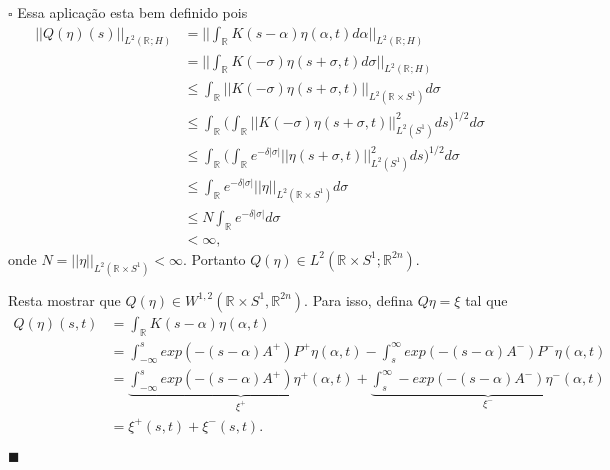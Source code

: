 \documentclass[12pt]{book}
\newenvironment{prova}[1]{$\square$ #1}{\hfill$\blacksquare$}
\newcommand{\circulo}{S^{1}}
\newcommand{\espacoLdois}[1]{L^{2}(#1)}
\newcommand{\espacoLpGeral}[2]{L^{#1}(#2)}
\newcommand{\espacosobolevdois}[2]{\espacosobolevgeral{2}{#1, #2}}
\newcommand{\espacosobolevgeral}[2]{W^{1,#1}(#2)}
\newcommand{\norma}[1]{||#1||}
\newcommand{\normagrande}[1]{\Big|\Big|#1\Big|\Big|}
\newcommand{\retacartesianocirculo}{\real{} \times \circulo}
\newcommand{\real}[1]{\mathbb{R}^{#1}}
\newcommand{\reta}{\real{}}
\begin{document}
\begin{prova}
		Essa aplicação esta bem definido pois
		$$
		\begin{aligned}
		\norma{Q(\eta)(s)}_{\espacoLpGeral{2}{\reta;H}} &= \normagrande{\int_{\real{}}K(s-\alpha)\eta(\alpha, t)d\alpha}_{\espacoLpGeral{2}{\reta;H}}
		\\
		&= \normagrande{\int_{\real{}}K(-\sigma)\eta(s+\sigma, t)d\sigma}_{\espacoLpGeral{2}{\reta;H}}
		\\
		&\leq
		\int_{\reta}\norma{K(-\sigma)\eta(s+\sigma, t)}_{\espacoLpGeral{2}{\retacartesianocirculo}}d\sigma
		\\
		&\leq
		\int_{\reta}\Big(\int_{\reta} \norma{K(-\sigma)\eta(s+\sigma, t)}_{\espacoLdois{\circulo}}^{2}ds\Big)^{1/2}d\sigma
		\\
		&\leq
		\int_{\reta}\Big(\int_{\reta}e^{-\delta|\sigma|} \norma{\eta(s+\sigma, t)}_{\espacoLdois{\circulo}}^{2}ds\Big)^{1/2}d\sigma
		\\
		&\leq
		\int_{\reta}e^{-\delta|\sigma|}\norma{\eta}_{\espacoLdois{\retacartesianocirculo}}d\sigma
		\\
		&\leq N\int_{\reta}e^{-\delta|\sigma|}d\sigma
		\\
		&< \infty,	
		\end{aligned}
		$$
		onde $N=\norma{\eta}_{\espacoLdois{\retacartesianocirculo}}
		<\infty$. Portanto $Q(\eta) \in \espacoLdois{\retacartesianocirculo;\real{2n}}$. 
		
		Resta mostrar que $Q(\eta) \in \espacosobolevdois{\retacartesianocirculo}{\real{2n}}$. Para isso, defina $Q\eta = \xi$ tal que
		$$
		\begin{aligned}
		Q(\eta)(s,t) 
		&= \int_{\reta}K(s-\alpha)\eta(\alpha,t)
		\\
		&=\int_{-\infty}^{s}exp(-(s-\alpha)A^{+})P^{+}\eta(\alpha,t)-\int_{s}^{\infty}exp(-(s-\alpha)A^{-})P^{-}\eta(\alpha,t)
		\\
		&=\underbrace{\int_{-\infty}^{s}exp(-(s-\alpha)A^{+})\eta^{+}(\alpha,t)}_{\xi^{+}} +\underbrace{\int_{s}^{\infty}-exp(-(s-\alpha)A^{-})\eta^{-}(\alpha,t)}_{\xi^{-}}
		\\
		&= \xi^{+}(s,t)+\xi^{-}(s,t).
		\end{aligned}
		$$
		

\end{prova}
\end{document}
